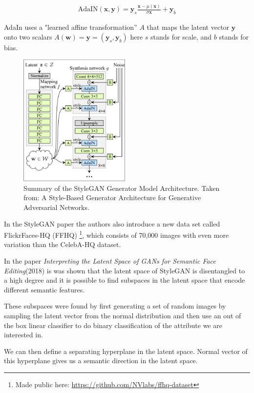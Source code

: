 \begin{align}
  \text{AdaIN}(\mathbf{x},\mathbf{y}) = \mathbf{y}_s \frac{\mathbf{x}-\mu(\mathbf{x})}{\sigma{\mathbf{x}}}+\mathbf{y}_b
\end{align}

AdaIn uses a "learned affine transformation” $A$ that maps the latent  vector $\mathbf{y}$ onto two scalars $A(\mathbf{w})= \mathbf{y}=(\mathbf{y}_s,\mathbf{y}_b)$ here $s$ stands for scale, and $b$ stands for bias.

\begin{figure}
\includegraphics[width=5.5cm]{fig/stylegan-arch}
\caption{Summary of the StyleGAN Generator Model Architecture.
Taken from: A Style-Based Generator Architecture for Generative Adversarial Networks.\cite{stylegan}}
\label{stylegan-arch}
\end{figure}


In the StyleGAN paper the authors also introduce a new data set called FlickrFaces-HQ (FFHQ) \footnote{Made public here: \url{https://github.com/NVlabs/ffhq-dataset}}, which consists of 70,000 images with even more variation than the CelebA-HQ dataset.\cite{stylegan}

In the paper \textit{Interpreting the Latent Space of GANs for Semantic Face Editing}(2018)\cite{interfacegan} is was shown that the latent space of StyleGAN is disentangled to a high degree and it is possible to find subspaces in the latent space that encode different semantic features.

These subspaces were found by first generating a set of random images by sampling the latent vector from the normal distribution and then use an out of the box linear classifier to do binary classification of the attribute we are interested in.

We can then define a separating hyperplane in the latent space. Normal vector of this hyperplane gives us a semantic direction in the latent space.










